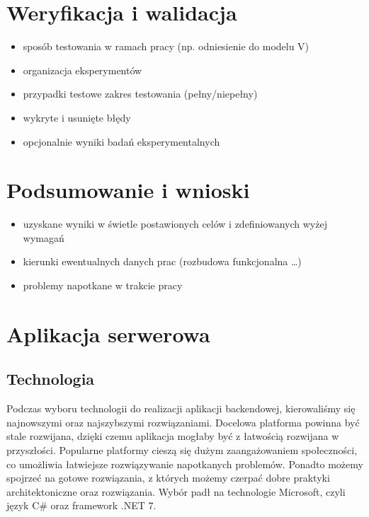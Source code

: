 \documentclass[a4paper,twoside,12pt]{book}
\begin{document}
\chapter{Weryfikacja i walidacja}
\label{ch:06}
\begin{itemize}
\item sposób testowania w ramach pracy (np. odniesienie do modelu V)
\item organizacja eksperymentów
\item przypadki testowe zakres testowania (pełny/niepełny)
\item wykryte i usunięte błędy
\item opcjonalnie wyniki badań eksperymentalnych
\end{itemize}


\chapter{Podsumowanie i wnioski}
\begin{itemize}
\item uzyskane wyniki w świetle postawionych celów i zdefiniowanych wyżej wymagań
\item kierunki ewentualnych danych prac (rozbudowa funkcjonalna …)
\item problemy napotkane w trakcie pracy
\end{itemize}

\chapter{Aplikacja serwerowa}
\section{Technologia}
Podczas wyboru technologii do realizacji aplikacji backendowej, kierowaliśmy się najnowszymi oraz najszybszymi rozwiązaniami. Docelowa platforma powinna być stale rozwijana, dzięki czemu aplikacja mogłaby być z łatwością rozwijana w przyszłości. Popularne platformy cieszą się dużym zaangażowaniem społeczności, co umożliwia łatwiejsze rozwiązywanie napotkanych problemów. Ponadto możemy spojrzeć na gotowe rozwiązania, z których możemy czerpać dobre praktyki architektoniczne oraz rozwiązania. Wybór padł na technologie Microsoft, czyli język C\# oraz framework .NET 7.  
\end{document}

